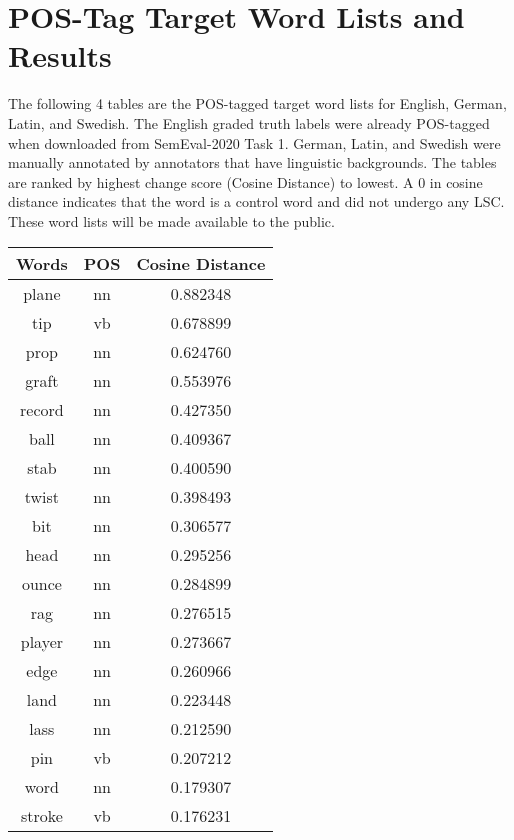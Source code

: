 \section{POS-Tag Target Word Lists and Results}
\label{app-postags}


The following 4 tables are the POS-tagged target word lists for English, German, Latin, and Swedish. The English graded truth labels were already POS-tagged when downloaded from SemEval-2020 Task 1. German, Latin, and Swedish were manually annotated by annotators that have linguistic backgrounds. The tables are ranked by highest change score (Cosine Distance) to lowest. A 0 in cosine distance indicates that the word is a control word and did not undergo any LSC. These word lists will be made available to the public.


\begin{table}[h]
\centering
\begin{tabular}{ccc} 
\toprule
Words         & POS & Cosine Distance  \\ 
\midrule
plane         & nn  & 0.882348         \\
tip           & vb  & 0.678899         \\
prop          & nn  & 0.624760         \\
graft         & nn  & 0.553976         \\
record        & nn  & 0.427350         \\
ball          & nn  & 0.409367         \\
stab          & nn  & 0.400590         \\
twist         & nn  & 0.398493         \\
bit           & nn  & 0.306577         \\
head          & nn  & 0.295256         \\
ounce         & nn  & 0.284899         \\
rag           & nn  & 0.276515         \\
player        & nn  & 0.273667         \\
edge          & nn  & 0.260966         \\
land          & nn  & 0.223448         \\
lass          & nn  & 0.212590         \\
pin           & vb  & 0.207212         \\
word          & nn  & 0.179307         \\
stroke        & vb  & 0.176231         \\

\end{tabular}
\end{table}
